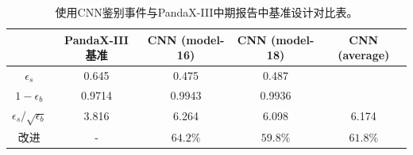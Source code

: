 \begin{table}[hbt]
    \centering
    \caption{使用CNN鉴别事件与PandaX-III中期报告中基准设计对比表。}
    \begin{tabular}{ccccc}
      \\\hline
      & PandaX-III 基准 & CNN (model-16) & CNN (model-18) & CNN (average) \\\hline
      $\epsilon_{s}$ & 0.645 & 0.475  & 0.487 & \\
      $ 1-\epsilon_{b}$ & 0.9714 & 0.9943  & 0.9936 &\\
      $\epsilon_{s}/\sqrt{\epsilon_{b}}$ & 3.816 & 6.264 & 6.098 & 6.174 \\\hline
      改进 & - & $64.2\%$ & $59.8\%$ & $61.8\%$\\\hline
    \end{tabular}
    \label{tab:comparison}
  \end{table}
  

